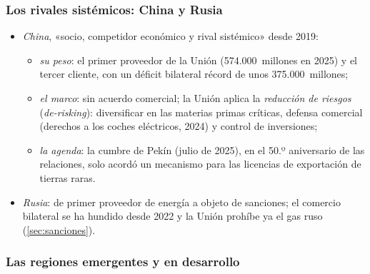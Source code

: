 \documentclass[11pt]{article}
\begin{document}
\subsubsection{Los rivales sistémicos: China y Rusia}\label{sec:rivales}

\begin{itemize}
\item \emph{China}, «socio, competidor económico y rival sistémico» desde 2019\nocite{CE2019China}:
  \begin{itemize}
  \item \emph{su peso}: el primer proveedor de la Unión (574.000~millones en 2025) y el tercer cliente, con un déficit bilateral récord de unos 375.000~millones;
  \item \emph{el marco}: sin acuerdo comercial; la Unión aplica la \emph{reducción de riesgos} (\emph{de-risking}): diversificar en las materias primas críticas, defensa comercial (derechos a los coches eléctricos, 2024) y control de inversiones;
  \item \emph{la agenda}: la cumbre de Pekín (julio de 2025), en el 50.º aniversario de las relaciones, solo acordó un mecanismo para las licencias de exportación de tierras raras.
  \end{itemize}
\item \emph{Rusia}: de primer proveedor de energía a objeto de sanciones; el comercio bilateral se ha hundido desde 2022 y la Unión prohíbe ya el gas ruso (\ref{sec:sanciones}).
\end{itemize}

\subsubsection{Las regiones emergentes y en desarrollo}\label{sec:regiones}
\end{document}
